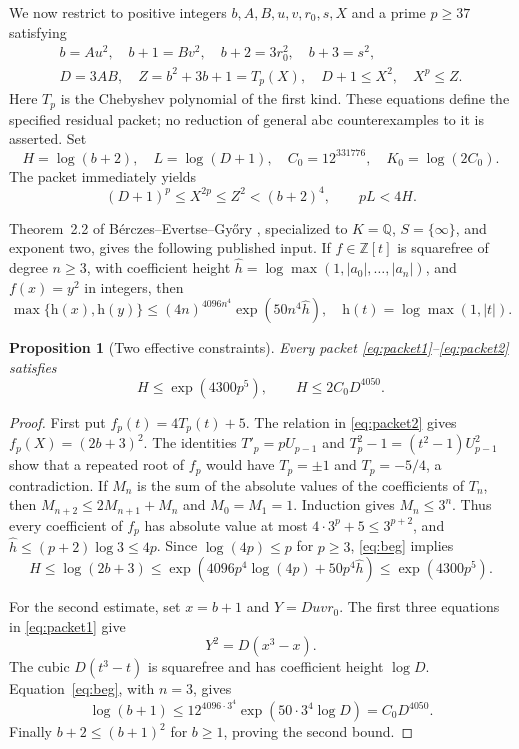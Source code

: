 \documentclass[11pt]{amsart}
\newtheorem{proposition}[theorem]{Proposition}
\theoremstyle{definition}
\theoremstyle{remark}
\newcommand{\Q}{\mathbb Q}
\newcommand{\Z}{\mathbb Z}
\newcommand{\height}{\mathrm h}
\begin{document}
We now restrict to positive integers $b,A,B,u,v,r_0,s,X$ and a prime
$p\ge37$ satisfying
\begin{align}
 b=Au^2,\quad b+1=Bv^2,\quad b+2=3r_0^2,\quad b+3=s^2,\label{eq:packet1}\\
 D=3AB,\quad Z=b^2+3b+1=T_p(X),\quad
 D+1\le X^2,\quad X^p\le Z.\label{eq:packet2}
\end{align}
Here $T_p$ is the Chebyshev polynomial of the first kind. These equations
define the specified residual packet; no reduction of general abc
counterexamples to it is asserted.
Set
\[
 H=\log(b+2),\quad L=\log(D+1),\quad
 C_0=12^{331776},\quad K_0=\log(2C_0).
\]
The packet immediately yields
\begin{equation}\label{eq:packetgate}
 (D+1)^p\le X^{2p}\le Z^2<(b+2)^4,\qquad pL<4H.
\end{equation}

Theorem~2.2 of B\'erczes--Evertse--Gy\H{o}ry \cite{BEG}, specialized to
$K=\Q$, $S=\{\infty\}$, and exponent two, gives the following published
input. If $f\in\Z[t]$ is squarefree of degree $n\ge3$, with coefficient
height $\widehat h=\log\max(1,|a_0|,\ldots,|a_n|)$, and $f(x)=y^2$
in integers, then
\begin{equation}\label{eq:beg}
 \max\{\height(x),\height(y)\}
 \le (4n)^{4096n^4}\exp(50n^4\widehat h),
 \quad \height(t)=\log\max(1,|t|).
\end{equation}

\begin{proposition}[Two effective constraints]\label{prop:pell}
Every packet \eqref{eq:packet1}--\eqref{eq:packet2} satisfies
\begin{equation}\label{eq:two-effective}
 H\le\exp(4300p^5),\qquad H\le2C_0D^{4050}.
\end{equation}
\end{proposition}
\begin{proof}
First put $f_p(t)=4T_p(t)+5$. The relation in \eqref{eq:packet2} gives
$f_p(X)=(2b+3)^2$.
The identities $T'_p=pU_{p-1}$ and
$T_p^2-1=(t^2-1)U_{p-1}^2$ show that a repeated root of $f_p$ would have
$T_p=\pm1$ and $T_p=-5/4$, a contradiction.
If $M_n$ is the sum of the absolute values of the coefficients of $T_n$,
then $M_{n+2}\le2M_{n+1}+M_n$ and $M_0=M_1=1$.
Induction gives $M_n\le3^n$. Thus every coefficient of $f_p$ has
absolute value at most $4\cdot3^p+5\le3^{p+2}$, and
$\widehat h\le(p+2)\log3\le4p$.
Since $\log(4p)\le p$ for $p\ge3$, \eqref{eq:beg} implies
\[
 H\le\log(2b+3)
 \le\exp\!\left(4096p^4\log(4p)+50p^4\widehat h\right)
 \le\exp(4300p^5).
\]

For the second estimate, set $x=b+1$ and $Y=Duvr_0$.
The first three equations in \eqref{eq:packet1} give
\begin{equation}\label{eq:ellipticpacket}
 Y^2=D(x^3-x).
\end{equation}
The cubic $D(t^3-t)$ is squarefree and has coefficient height $\log D$.
Equation~\eqref{eq:beg}, with $n=3$, gives
\[
 \log(b+1)\le12^{4096\cdot3^4}\exp(50\cdot3^4\log D)
 =C_0D^{4050}.
\]
Finally $b+2\le(b+1)^2$ for $b\ge1$, proving the second bound.
\end{proof}
\end{document}
